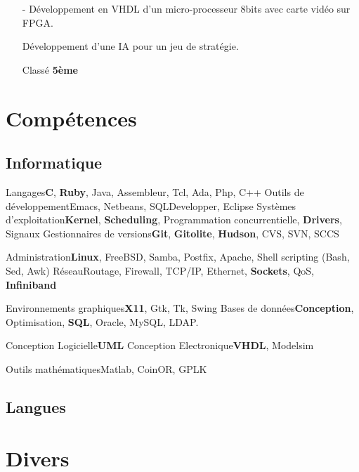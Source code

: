 \documentclass[10pt,a4paper]{moderncv}
\begin{document}
{
\begin{itemize}
\item[-]{Développement en VHDL d'un micro-processeur 8bits avec carte vidéo sur FPGA.}
\end{itemize}
}

{
\begin{itemize}
\item[]{Développement d'une IA pour un jeu de stratégie.}
\item[]{Classé \textbf{5ème}}
\end{itemize}
}

\section{Compétences}
\subsection{Informatique}
\cvcomputer
{Langages}{\textbf{C}, \textbf{Ruby}, Java, Assembleur, Tcl, Ada, Php, C++}
{Outils de développement}{Emacs, Netbeans, SQLDevelopper, Eclipse}
\cvcomputer
{Systèmes d'exploitation}{\textbf{Kernel}, \textbf{Scheduling}, Programmation concurrentielle, \textbf{Drivers}, Signaux}
{Gestionnaires de versions}{\textbf{Git}, \textbf{Gitolite}, \textbf{Hudson}, CVS, SVN, SCCS}


\cvcomputer
{Administration}{\textbf{Linux}, FreeBSD, Samba, Postfix, Apache, Shell scripting (Bash, Sed, Awk)}
{Réseau}{Routage, Firewall, TCP/IP, Ethernet, \textbf{Sockets}, QoS, \textbf{Infiniband}}

\cvcomputer
{Environnements graphiques}{\textbf{X11}, Gtk, Tk, Swing}
{Bases de données}{\textbf{Conception}, Optimisation, \textbf{SQL}, Oracle, MySQL, LDAP.}

\cvcomputer
{Conception Logicielle}{\textbf{UML}}
{Conception Electronique}{\textbf{VHDL}, Modelsim}

\cvcomputer
{Outils mathématiques}{Matlab, CoinOR, GPLK}{}{}

\subsection{Langues}

\section{Divers}
\end{document}
